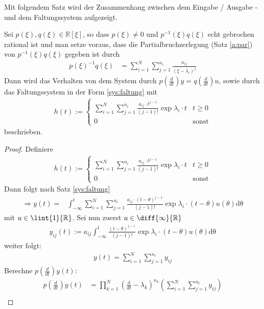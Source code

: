 Mit folgendem Satz wird der Zusammenhang zwischen dem Eingabe / Ausgabe - und dem Faltungssystem aufgezeigt.
\begin{satz} \label{s:Impuls} Sei $p(\xi), q(\xi) \in \mathbb{R}[\xi]$, so dass $p(\xi) \neq 0$ und $p^{-1}(\xi)q(\xi)$ echt gebrochen rational ist und man setze voraus, dass die Partialbruchzerlegung (Satz \ref{a:par}) von $p^{-1}(\xi)q(\xi)$ gegeben ist durch
\begin{align}
	p(\xi)^{-1}q(\xi) &= \sum_{i=1}^{N}{\sum^{n_i}_{j=1}{\frac{a_{ij}}{(\xi - \lambda_i)^j}}}
\end{align}
Dann wird das Verhalten von dem System durch $p(\frac{d}{dt})y = q(\frac{d}{dt})u$, sowie durch das Faltungssystem in der Form \ref{sys:faltung} mit 
\begin{align}
	h(t):=
	\begin{cases}
		\sum_{i=1}^{N}{\sum^{n_i}_{j=1}{\frac{a_{ij}\cdot t^{j-1}}{(j-1)!}\exp{\lambda_i\cdot t}}} & t\geq 0 \\
		0 & \text{sonst}
	\end{cases}  
\end{align}
beschrieben. 
\begin{proof}
Definiere 
\begin{align}
	h(t):=
	\begin{cases}
		\sum_{i=1}^{N}{\sum^{n_i}_{j=1}{\frac{a_{ij}\cdot t^{j-1}}{(j-1)!}\exp{\lambda_i\cdot t}}} & t\geq 0 \\
		0 & \text{sonst}
	\end{cases}   
\end{align}
Dann folgt nach Satz \ref{sys:faltung}
\begin{align}
	\Rightarrow y(t)=& \int_{-\infty}^t \sum_{i=1}^{N}{\sum^{n_i}_{j=1}{\frac{a_{ij}\cdot (t-\theta)^{j-1}}{(j-1)!}\exp{\lambda_i\cdot (t-\theta)}}} u(\theta) \mathrm{d\theta}
\end{align} mit $u \in \lint{1}{\mathbb{R}}$.  
Sei nun zuerst $u \in \diff{\infty}{\mathbb{R}}$ 
\begin{align}
	y_{ij}(t):= a_{ij} \int_{-\infty}^t {\frac{(t-\theta)^{j-1}}{(j-1)!}\exp{\lambda_i\cdot (t-\theta)}} u(\theta) \mathrm{d\theta}
\end{align} 
weiter folgt:
\begin{align}
	y(t) = \sum_{i=1}^{N}{\sum^{n_i}_{j=1}{y_{ij}}}
\end{align}
Berechne $p(\frac{d}{dt})y(t)$:
\begin{align}
	p(\frac{d}{dt})y(t) &= \prod_{k=1}^N (\frac{d}{dt} -\lambda_k)^{n_{k}}\left(\sum_{i=1}^{N}{\sum^{n_i}_{j=1}{y_{ij}}}\right)\\

\end{align}
\end{proof}
\end{satz}
